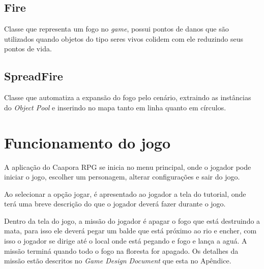 \subsection{Fire}
Classe que representa um fogo no \textit{game}, possui pontos de danos que são utilizados quando objetos do tipo seres vivos colidem com ele reduzindo seus pontos de vida.


\subsection{SpreadFire}
Classe que automatiza a expansão do fogo pelo cenário, extraindo as instâncias do \textit{Object Pool} e inserindo no mapa tanto em linha quanto em círculos.

\section{Funcionamento do jogo}
A aplicação do Caapora RPG se inicia no menu principal, onde o jogador pode iniciar o jogo, escolher um personagem, alterar configurações e sair do jogo.

Ao selecionar a opção jogar, é apresentado ao jogador a tela do tutorial, onde terá uma breve descrição do que o jogador deverá fazer durante o jogo. 

Dentro da tela do jogo, a missão do jogador é apagar o fogo que está destruindo a mata, para isso ele deverá pegar um balde que está próximo ao rio e encher, com isso o jogador se dirige até o local onde está pegando e fogo e lança a aguá. A missão terminá quando todo o fogo na floresta for apagado. Os detalhes da missão estão descritos no \textit{Game Design Document} que esta no Apêndice.
